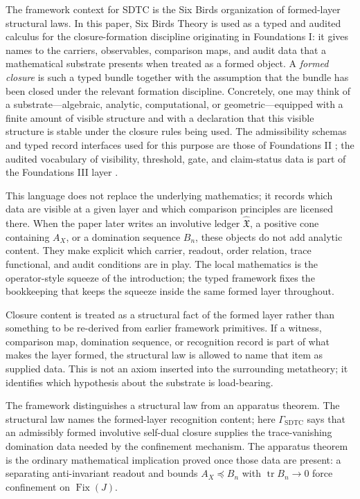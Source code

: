 \documentclass[11pt]{article}
\DeclareMathOperator{\Fix}{Fix}
\DeclareMathOperator{\trace}{tr}
\newcommand{\AX}{A_{X}}
\newcommand{\IOL}{\hat{\mathfrak{X}}}
\newcommand{\GamSDTC}{\Gamma_{\mathrm{SDTC}}}
\theoremstyle{definition}
\begin{document}
The framework context for SDTC is the Six Birds organization of
formed-layer structural laws.  In this paper, Six Birds Theory is
used as a typed and audited calculus for the closure-formation
discipline originating in Foundations I: it gives names to the
carriers, observables, comparison maps, and audit data that a
mathematical substrate presents when treated as a formed object.
A \emph{formed closure} is such a typed bundle together with the
assumption that the bundle has been closed under the relevant
formation discipline.  Concretely, one may think of a
substrate---algebraic, analytic, computational, or
geometric---equipped with a finite amount of visible structure and
with a declaration that this visible structure is stable under the
closure rules being used.  The admissibility schemas and typed
record interfaces used for this purpose are those of Foundations II
\cite{TsiokosFoundationsII2026}; the audited vocabulary of
visibility, threshold, gate, and claim-status data is part of the
Foundations III layer \cite{TsiokosFoundationsIII2026}.

This language does not replace the underlying mathematics; it
records which data are visible at a given layer and which comparison
principles are licensed there.  When the paper later writes an
involutive ledger \(\IOL\), a positive cone containing \(\AX\), or a
domination sequence \(B_n\), these objects do not add analytic
content.  They make explicit which carrier, readout, order relation,
trace functional, and audit conditions are in play.  The local
mathematics is the operator-style squeeze of the introduction; the
typed framework fixes the bookkeeping that keeps the squeeze inside
the same formed layer throughout.

Closure content is treated as a structural fact of the formed layer
rather than something to be re-derived from earlier framework
primitives.  If a witness, comparison map, domination sequence, or
recognition record is part of what makes the layer formed, the
structural law is allowed to name that item as supplied data.  This
is not an axiom inserted into the surrounding metatheory; it
identifies which hypothesis about the substrate is load-bearing.

The framework distinguishes a structural law from an apparatus
theorem.  The structural law names the formed-layer recognition
content; here \(\GamSDTC\) says that an admissibly formed involutive
self-dual closure supplies the trace-vanishing domination data
needed by the confinement mechanism.  The apparatus theorem is the
ordinary mathematical implication proved once those data are
present: a separating anti-invariant readout and bounds
\(\AX \preceq B_n\) with \(\trace B_n\to0\) force confinement on
\(\Fix(J)\).
\end{document}
